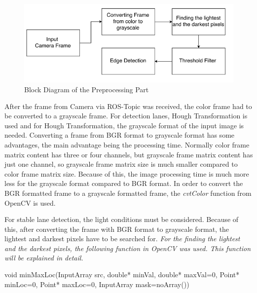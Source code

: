 \begin{figure}[H]
 \centering
  \includegraphics[width=1\textwidth]{./Bilder/Presprocessing_Figure.png}	
  \caption{Block Diagram of the Preprocessing Part}
  \label{fig:Block_Diagram_of_the_Preprocessing_Part}
\end{figure}





After the frame from Camera via ROS-Topic was received, the color frame had to be converted to a grayscale frame. For detection lanes, Hough Transformation is used and for Hough Transformation, the grayscale format of the input image is needed. Converting a frame from BGR format to grayscale format has some advantages, the main advantage being the processing time. Normally color frame matrix content has three or four channels, but grayscale frame matrix content has just one channel, so grayscale frame matrix size is much smaller compared to color frame matrix size. Because of this, the image processing time is much more less for the grayscale format compared to BGR format. In order to convert the BGR formatted frame to a grayscale formatted frame, the \textit{cvtColor} function from OpenCV is used.

For stable lane detection, the light conditions must be considered. Because of this, after converting the frame with BGR format to grayscale format, the lightest and darkest pixels have to be searched for. \emph{\color{blue}For the finding the lightest and the darkest pixels, the following function in OpenCV was used. This function will be explained in detail.}\cite{addWeighted}


\begin{center}

void minMaxLoc(InputArray src, double* minVal, double* maxVal=0, Point* minLoc=0, Point* maxLoc=0, InputArray mask=noArray())

\end{center}

